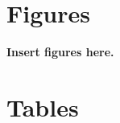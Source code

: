 \documentclass[12pt,a4paper]{article}
\begin{document}



\newpage



\newpage
\section{Figures}

\textbf{Insert figures here.}

\newpage
\section{Tables}
\end{document}
